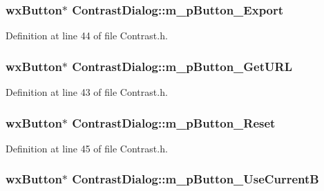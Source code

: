 \subsubsection[{\texorpdfstring{m\+\_\+p\+Button\+\_\+\+Export}{m_pButton_Export}}]{\setlength{\rightskip}{0pt plus 5cm}wx\+Button$\ast$ Contrast\+Dialog\+::m\+\_\+p\+Button\+\_\+\+Export}\hypertarget{class_contrast_dialog_a9a2bb011b64fec909dec844bdb60916d}{}\label{class_contrast_dialog_a9a2bb011b64fec909dec844bdb60916d}


Definition at line 44 of file Contrast.\+h.

\subsubsection[{\texorpdfstring{m\+\_\+p\+Button\+\_\+\+Get\+U\+RL}{m_pButton_GetURL}}]{\setlength{\rightskip}{0pt plus 5cm}wx\+Button$\ast$ Contrast\+Dialog\+::m\+\_\+p\+Button\+\_\+\+Get\+U\+RL}\hypertarget{class_contrast_dialog_afbe34d1ad293853e276cf01fc918668e}{}\label{class_contrast_dialog_afbe34d1ad293853e276cf01fc918668e}


Definition at line 43 of file Contrast.\+h.

\subsubsection[{\texorpdfstring{m\+\_\+p\+Button\+\_\+\+Reset}{m_pButton_Reset}}]{\setlength{\rightskip}{0pt plus 5cm}wx\+Button$\ast$ Contrast\+Dialog\+::m\+\_\+p\+Button\+\_\+\+Reset}\hypertarget{class_contrast_dialog_aadc6db15b135686c49997087e177fdcb}{}\label{class_contrast_dialog_aadc6db15b135686c49997087e177fdcb}


Definition at line 45 of file Contrast.\+h.

\subsubsection[{\texorpdfstring{m\+\_\+p\+Button\+\_\+\+Use\+CurrentB}{m_pButton_UseCurrentB}}]{\setlength{\rightskip}{0pt plus 5cm}wx\+Button$\ast$ Contrast\+Dialog\+::m\+\_\+p\+Button\+\_\+\+Use\+CurrentB}\hypertarget{class_contrast_dialog_a2c0d1b5cdeff1a4a22b980a30ed5ae37}{}\label{class_contrast_dialog_a2c0d1b5cdeff1a4a22b980a30ed5ae37}


